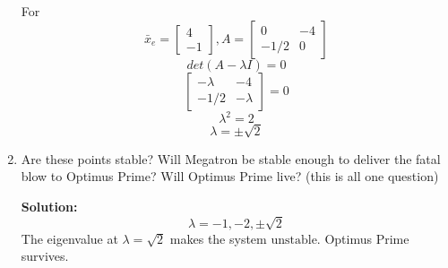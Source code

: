 \documentclass{article}
\begin{document}
\begin{enumerate}[label=(\alph*)]
For 
$$\bar{x}_e = \begin{bmatrix}
    4 \\
    -1
\end{bmatrix}, A = \begin{bmatrix}
    0 & -4 \\
    -1/2 & 0
\end{bmatrix}$$
$$det(A - \lambda  I) = 0$$
$$\begin{bmatrix}
    -\lambda & -4 \\
    -1/2 & -\lambda
\end{bmatrix} = 0$$
$$\lambda^2 = 2$$
$$\boxed{\lambda = \pm \sqrt{2}}$$

    \item {Are these points stable? Will Megatron be stable enough to deliver the fatal blow to Optimus Prime? Will Optimus Prime live? (this is all one question)}

\textbf{Solution:}
$$\lambda = -1,-2,\pm \sqrt{2}$$
The eigenvalue at $\lambda = \sqrt{2}$ makes the system $\boxed{\text{unstable}}$.  Optimus Prime survives.
\end{enumerate}
\end{document}
